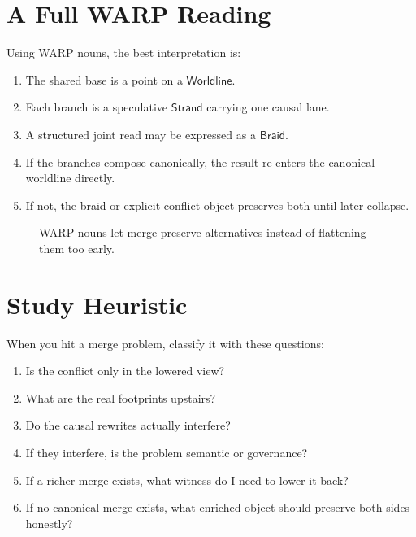\documentclass[11pt]{article}
\newcommand{\Worldline}{\ensuremath{\mathsf{Worldline}}}
\newcommand{\Strand}{\ensuremath{\mathsf{Strand}}}
\newcommand{\Braid}{\ensuremath{\mathsf{Braid}}}
\theoremstyle{definition}
\begin{document}
\section{A Full WARP Reading}

Using WARP nouns, the best interpretation is:
\begin{enumerate}[leftmargin=2em]
\item The shared base is a point on a \Worldline{}.
\item Each branch is a speculative \Strand{} carrying one causal lane.
\item A structured joint read may be expressed as a \Braid{}.
\item If the branches compose canonically, the result re-enters the canonical
  worldline directly.
\item If not, the braid or explicit conflict object preserves both until later
  collapse.
\end{enumerate}

\begin{figure}[h]
\centering
{}
\caption{WARP nouns let merge preserve alternatives instead of flattening them too early.}
\end{figure}

\section{Study Heuristic}

When you hit a merge problem, classify it with these questions:
\begin{enumerate}[leftmargin=2em]
\item Is the conflict only in the lowered view?
\item What are the real footprints upstairs?
\item Do the causal rewrites actually interfere?
\item If they interfere, is the problem semantic or governance?
\item If a richer merge exists, what witness do I need to lower it back?
\item If no canonical merge exists, what enriched object should preserve both
  sides honestly?
\end{enumerate}
\end{document}
